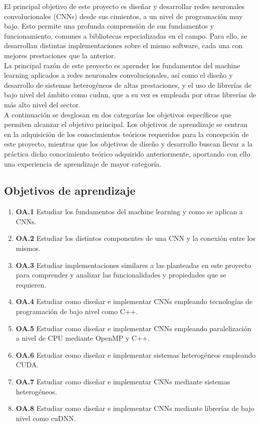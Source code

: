 El principal objetivo de este proyecto es diseñar y desarrollar redes neuronales convolucionales (CNNs) desde sus cimientos, a un nivel de programación muy bajo. Esto permite una profunda comprensión de sus fundamentos y funcionamiento, comunes a bibliotecas especializadas en el campo. Para ello, se desarrollan distintas implementaciones sobre el mismo software, cada una con mejores prestaciones que la anterior. \\
La principal razón de este proyecto es aprender los fundamentos del machine learning aplicados a redes neuronales convolucionales, así como el diseño y desarrollo de sistemas heterogéneos de altas prestaciones, y el uso de librerías de bajo nivel del ámbito como cudnn, que a su vez es empleada por otras librerías de más alto nivel del sector. \\
A continuación se desglosan en dos categorías los objetivos específicos que permiten alcanzar el objetivo principal. Los objetivos de aprendizaje se centran en la adquisición de los conocimientos teóricos requeridos para la concepción de este proyecto, mientras que los objetivos de diseño y desarrollo buscan llevar a la práctica dicho conocimiento teórico adquirido anteriormente, aportando con ello una experiencia de aprendizaje de mayor categoría.

\subsection{Objetivos de aprendizaje}

\begin{enumerate}[label=\textbullet]
	\item \textbf{OA.1} Estudiar los fundamentos del machine learning y como se aplican a CNNs.
	
	\item \textbf{OA.2} Estudiar los distintos componentes de una CNN y la conexión entre los mismos.
	
	\item \textbf{OA.3} Estudiar implementaciones similares a las planteadas en este proyecto para comprender y analizar las funcionalidades y propiedades que se requieren. 
	
	\item \textbf{OA.4} Estudiar como diseñar e implementar CNNs empleando tecnologías de programación de bajo nivel como C++.
	
	\item \textbf{OA.5} Estudiar como diseñar e implementar CNNs empleando paralelización a nivel de CPU mediante OpenMP y C++.
	
	\item \textbf{OA.6} Estudiar como diseñar e implementar sistemas heterogéneos empleando CUDA.

	\item \textbf{OA.7} Estudiar como diseñar e implementar CNNs mediante sistemas heterogéneos.

	\item \textbf{OA.8} Estudiar como diseñar e implementar CNNs mediante librerías de bajo nivel como cuDNN.

\end{enumerate}

